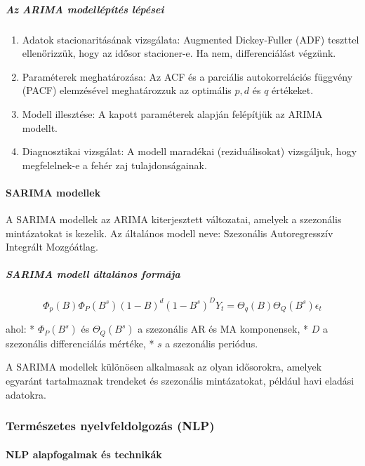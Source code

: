 \documentclass[11pt]{article}
\providecommand{\tightlist}{%
      \setlength{\itemsep}{0pt}\setlength{\parskip}{0pt}}
\begin{document}
\subparagraph{Az ARIMA modellépítés
lépései}\label{az-arima-modelluxe9puxedtuxe9s-luxe9puxe9sei}

\begin{enumerate}
\def\labelenumi{\arabic{enumi}.}
\tightlist
\item
  Adatok stacionaritásának vizsgálata: Augmented Dickey-Fuller (ADF)
  teszttel ellenőrizzük, hogy az idősor stacioner-e. Ha nem,
  differenciálást végzünk.
\item
  Paraméterek meghatározása: Az ACF és a parciális autokorrelációs
  függvény (PACF) elemzésével meghatározzuk az optimális \(p, d\) és
  \(q\) értékeket.
\item
  Modell illesztése: A kapott paraméterek alapján felépítjük az ARIMA
  modellt.
\item
  Diagnosztikai vizsgálat: A modell maradékai (reziduálisokat)
  vizsgáljuk, hogy megfelelnek-e a fehér zaj tulajdonságainak.
\end{enumerate}

\paragraph{SARIMA modellek}\label{sarima-modellek}

A SARIMA modellek az ARIMA kiterjesztett változatai, amelyek a
szezonális mintázatokat is kezelik. Az általános modell neve: Szezonális
Autoregresszív Integrált Mozgóátlag.

\subparagraph{SARIMA modell általános
formája}\label{sarima-modell-uxe1ltaluxe1nos-formuxe1ja}

\[\Phi_p(B)\Phi_P(B^s)(1 - B)^d(1 - B^s)^DY_t = \Theta_q(B)\Theta_Q(B^s)\epsilon_t\]

ahol: * \(\Phi_P(B^s)\) és \(\Theta_Q(B^s)\) a szezonális AR és MA
komponensek, * \(D\) a szezonális differenciálás mértéke, * \(s\) a
szezonális periódus.

A SARIMA modellek különösen alkalmasak az olyan idősorokra, amelyek
egyaránt tartalmaznak trendeket és szezonális mintázatokat, például havi
eladási adatokra.

    \subsubsection{Természetes nyelvfeldolgozás
(NLP)}\label{termuxe9szetes-nyelvfeldolgozuxe1s-nlp}

\paragraph{NLP alapfogalmak és
technikák}\label{nlp-alapfogalmak-uxe9s-technikuxe1k}
\end{document}
